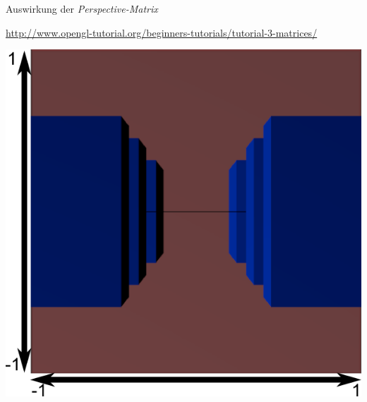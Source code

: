 \begin{frame}{Auswirkung der \emph{Perspective-Matrix}}
\begin{minipage}{.79\linewidth}
\begin{itemize}
\end{itemize}
{\tiny\url{http://www.opengl-tutorial.org/beginners-tutorials/tutorial-3-matrices/}}
\end{minipage}
%
\begin{minipage}{.20\linewidth}
\vspace{3pt}
\includegraphics[width=\linewidth]{./gfx/projected1}
\end{minipage}
%
\end{frame}


